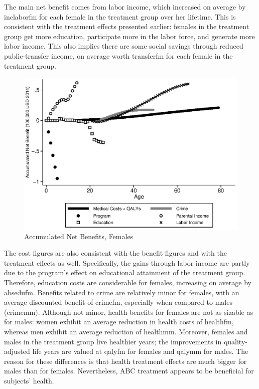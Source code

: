 \noindent The main net benefit comes from labor income, which increased on average by inclaborfm for each female in the treatment group over her lifetime. This is consistent with the treatment effects presented earlier: females in the treatment group get more education, participate more in the labor force, and generate more labor income. This also implies there are some social savings through reduced public-transfer income, on average worth transferfm for each female in the treatment group. 

\begin{center}
\begin{figure}[H] 
\caption{Accumulated Net Benefits, Females}
\label{fig:netbeneffemales}
\centering
\includegraphics[width=.9\columnwidth]{output/accumulatedcosts_f.eps}
\end{figure}
\end{center}

\noindent The cost figures are also consistent with the benefit figures and with the treatment effects as well. Specifically, the gains through labor income are partly due to the program's effect on educational attainment of the treatment group. Therefore, education costs are considerable for females, increasing on average by absedufm. Benefits related to crime are relatively minor for females, with an average discounted benefit of crimefm, especially when compared to males (crimemm). Although not minor, health benefits for females are not as sizable as for males: women exhibit an average reduction in health costs of healthfm, whereas men exhibit an average reduction of healthmm. Moreover, females and males in the treatment group live healthier years; the improvements in quality-adjusted life years are valued at qalyfm for females and qalymm for males. The reason for these differences is that health treatment effects are much bigger for males than for females. Nevertheless, ABC treatment appears to be beneficial for subjects' health. \\

